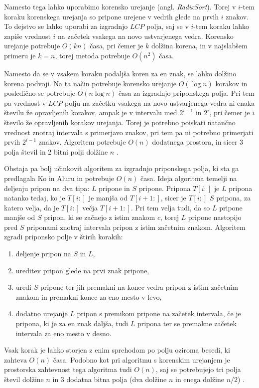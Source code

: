 Namesto tega lahko uporabimo korensko urejanje (angl. \textit{RadixSort}). Torej v $i$-tem koraku korenskega urejanja so pripone urejene v vedrih glede na prvih $i$ znakov. To dejstvo se lahko uporabi za izgradnjo $LCP$ polja, saj se v $i$-tem koraku lahko zapiše vrednost $i$ na začetek vsakega na novo ustvarjenega vedra. Korensko urejanje potrebuje $O(kn)$ časa, pri čemer je $k$ dolžina korena, in v najslabšem primeru je $k=n$, torej metoda potrebuje $O(n^2)$ časa.

Namesto da se v vsakem koraku podaljša koren za en znak, se lahko dolžino korena podvoji. Na ta način potrebuje korensko urejanje $O(\log{n})$ korakov in posledično se potrebuje $O(n\log{n})$ časa za izgradnjo priponskega polja. Pri tem pa vrednost v $LCP$ polju na začetku vsakega na novo ustvarjenega vedra ni enaka številu že opravljenih korakov, ampak je v intervalu med $2^{i-1}$ in $2^{i}$, pri čemer je $i$ število že opravljenih korakov urejanja. Torej je potrebno poiskati natančno vrednost znotraj intervala s primerjavo znakov, pri tem pa ni potrebno primerjati prvih $2^{i-1}$ znakov. Algoritem potrebuje $O(n)$ dodatnega prostora, in sicer 3 polja števil in 2 bitni polji dolžine $n$ \cite{Manber1990}.


Obstaja pa bolj učinkovit algoritem za izgradnjo priponskega polja, ki sta ga predlagala Ko in Aluru \cite{Ko2005} in potrebuje $O(n)$ časa. Ideja algoritma temelji na deljenju pripon na dva tipa: $L$ pripone in $S$ pripone. Pripona $T[i:]$ je $L$ pripona natanko tedaj, ko je $T[i:]$ je manjša od $T[i+1:]$, sicer je $T[i:]$ $S$ pripona, za katero velja, da je $T[i:]$ večja $T[i+1:]$. Pri tem velja tudi, da so $L$ pripone manjše od $S$ pripon, ki se začnejo z istim znakom $c$, torej $L$ pripone nastopijo pred $S$ priponami znotraj intervala pripon z istim začetnim znakom. Algoritem zgradi priponsko polje v štirih korakih:
\begin{enumerate}
    \item deljenje pripon na $S$ in $L$,
    \item ureditev pripon glede na prvi znak pripone,
    \item uredi $S$ pripone ter jih premakni na konec vedra pripon z istim začetnim znakom in premakni konec za eno mesto v levo,
    \item dodatno urejanje $L$ pripon s premikom pripone na začetek intervala, če je pripona, ki je za en znak daljša, tudi $L$ pripona ter se premakne začetek intervala za eno mesto v desno.
\end{enumerate}
Vsak korak je lahko storjen z enim sprehodom po polju oziroma besedi, ki zahteva $O(n)$ časa. Podobno kot pri algoritmu s korenskim urejanjem je prostorska zahtevnost tega algoritma tudi $O(n)$, saj se potrebujejo tri polja števil dolžine $n$ in 3 dodatna bitna polja (dva dolžine $n$ in enega dolžine $n/2$) \cite{Ko2005}.